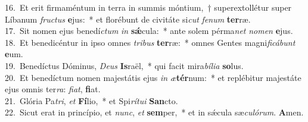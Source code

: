 {16.~}Et erit firmaméntum in terra in summis móntium,~† superextollétur super Líbanum \textit{fru}\textit{ctus} \textbf{e}jus:~* et florébunt de civitáte si\textit{cut} \textit{fe}\textit{num} \textbf{ter}ræ.\\
{17.~}Sit nomen ejus benedí\textit{ctum} \textit{in} \textbf{sǽ}cula:~* ante solem pérma\textit{net} \textit{no}\textit{men} \textbf{e}jus.\\
{18.~}Et benedicéntur in ipso omnes \textit{tri}\textit{bus} \textbf{ter}ræ:~* omnes Gentes magni\textit{fi}\textit{cá}\textit{bunt} \textbf{e}um.\\
{19.~}Benedíctus Dóminus, \textit{De}\textit{us} \textbf{Is}raël,~* qui facit mira\textit{bí}\textit{li}\textit{a} \textbf{so}lus.\\
{20.~}Et benedíctum nomen majestátis ejus \textit{in} \textit{æ}\textbf{tér}num:~* et replébitur majestáte ejus omnis ter\textit{ra}: \textit{fi}\textit{at}, \textbf{fi}at.\\
{21.~}Glória Pa\textit{tri}, \textit{et} \textbf{Fí}lio,~* et Spi\textit{rí}\textit{tu}\textit{i} \textbf{San}cto.\\
{22.~}Sicut erat in princípio, et \textit{nunc}, \textit{et} \textbf{sem}per,~* et in sǽcula sæ\textit{cu}\textit{ló}\textit{rum}. \textbf{A}men.\\
